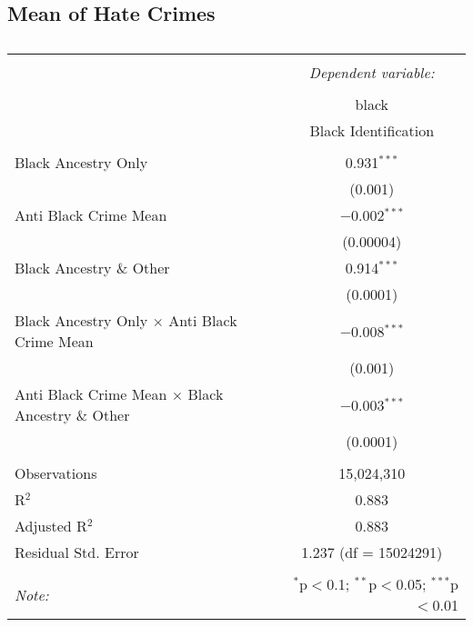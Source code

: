 \documentclass{article}
\begin{document}
\subsection{Mean of Hate Crimes}
    \begin{table}[!htbp] \centering 
      \caption{} 
      \label{} 
    \begin{tabular}{@{\extracolsep{5pt}}lc} 
    \\[-1.8ex]\hline 
    \hline \\[-1.8ex] 
     & \multicolumn{1}{c}{\textit{Dependent variable:}} \\ 
    \cline{2-2} 
    \\[-1.8ex] & black \\ 
     & Black Identification \\ 
    \hline \\[-1.8ex] 
     Black Ancestry Only & 0.931$^{***}$ \\ 
      & (0.001) \\ 
     Anti Black Crime Mean  & $-$0.002$^{***}$ \\ 
      & (0.00004) \\ 
     Black Ancestry \& Other & 0.914$^{***}$ \\ 
      & (0.0001) \\ 
     Black Ancestry Only $\times$ Anti Black Crime Mean  & $-$0.008$^{***}$ \\ 
      & (0.001) \\ 
     Anti Black Crime Mean $\times$  Black Ancestry \& Other & $-$0.003$^{***}$ \\ 
      & (0.0001) \\ 
    \hline \\[-1.8ex] 
    Observations & 15,024,310 \\ 
    R$^{2}$ & 0.883 \\ 
    Adjusted R$^{2}$ & 0.883 \\ 
    Residual Std. Error & 1.237 (df = 15024291) \\ 
    \hline 
    \hline \\[-1.8ex] 
    \textit{Note:}  & \multicolumn{1}{r}{$^{*}$p$<$0.1; $^{**}$p$<$0.05; $^{***}$p$<$0.01} \\ 
    \end{tabular} 
    \end{table} 
\end{document}

